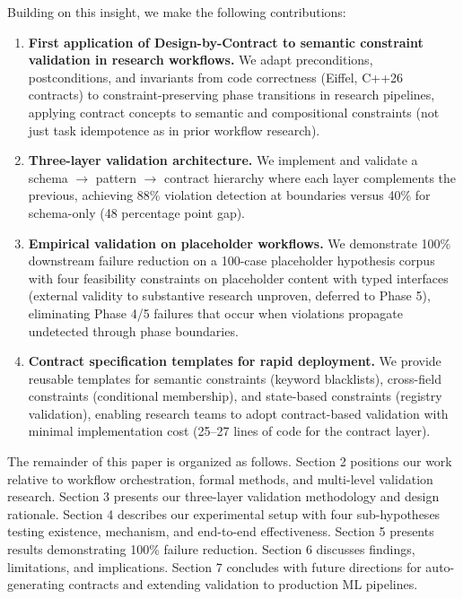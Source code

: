 Building on this insight, we make the following contributions:

\begin{enumerate}
\item \textbf{First application of Design-by-Contract to semantic constraint validation in research workflows.} We adapt preconditions, postconditions, and invariants from code correctness (Eiffel, C++26 contracts) to constraint-preserving phase transitions in research pipelines, applying contract concepts to semantic and compositional constraints (not just task idempotence as in prior workflow research).

\item \textbf{Three-layer validation architecture.} We implement and validate a schema $\rightarrow$ pattern $\rightarrow$ contract hierarchy where each layer complements the previous, achieving 88\% violation detection at boundaries versus 40\% for schema-only (48 percentage point gap).

\item \textbf{Empirical validation on placeholder workflows.} We demonstrate 100\% downstream failure reduction on a 100-case placeholder hypothesis corpus with four feasibility constraints on placeholder content with typed interfaces (external validity to substantive research unproven, deferred to Phase 5), eliminating Phase 4/5 failures that occur when violations propagate undetected through phase boundaries.

\item \textbf{Contract specification templates for rapid deployment.} We provide reusable templates for semantic constraints (keyword blacklists), cross-field constraints (conditional membership), and state-based constraints (registry validation), enabling research teams to adopt contract-based validation with minimal implementation cost (25--27 lines of code for the contract layer).
\end{enumerate}

The remainder of this paper is organized as follows. Section 2 positions our work relative to workflow orchestration, formal methods, and multi-level validation research. Section 3 presents our three-layer validation methodology and design rationale. Section 4 describes our experimental setup with four sub-hypotheses testing existence, mechanism, and end-to-end effectiveness. Section 5 presents results demonstrating 100\% failure reduction. Section 6 discusses findings, limitations, and implications. Section 7 concludes with future directions for auto-generating contracts and extending validation to production ML pipelines.
